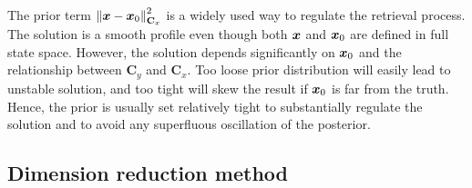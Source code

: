\documentclass[12pt,a4paper]{article}
\newcommand*{\norm}[1]{\left\lVert#1\right\rVert}
\newcommand{\mat}[1]{\mathbf{#1}}
\DeclareRobustCommand*{\vec}[1]{\ensuremath{
\mathchoice{\mbox{\boldmath$\displaystyle#1$}}
           {\mbox{\boldmath$\textstyle#1$}}
           {\mbox{\boldmath$\scriptstyle#1$}}
           {\mbox{\boldmath$\scriptscriptstyle#1$}}}}
\begin{document}
The prior term $\norm{\vec{x}-\vec{x}_0}_{\mat{C}_x}^2$ is a widely used way to regulate the retrieval process.
The solution is a smooth profile even though both $\vec{x}$ and $\vec{x}_0$ are defined in full state space.
However, the solution depends significantly on $\vec{x}_0$ and the relationship between
$\mat{C}_y$ and $\mat{C}_x$. Too loose prior distribution will easily lead to unstable solution, and too
tight will skew the result if $\vec{x}_0$ is far from the truth. Hence, the prior is usually
set relatively tight to substantially regulate the solution and to avoid any superfluous oscillation of the posterior.

\subsection{Dimension reduction method}
 
\end{document}

